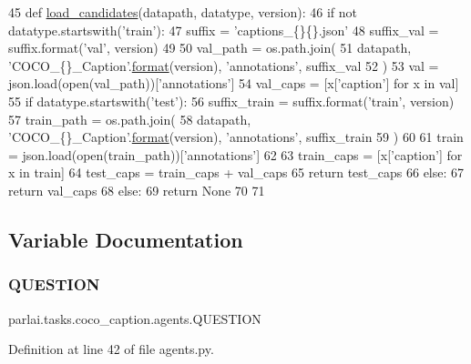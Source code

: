 \begin{DoxyCode}
45 \textcolor{keyword}{def }\hyperlink{namespaceparlai_1_1tasks_1_1coco__caption_1_1agents_aa190162d0e36e1c93fc224b8a049f0cf}{load\_candidates}(datapath, datatype, version):
46     \textcolor{keywordflow}{if} \textcolor{keywordflow}{not} datatype.startswith(\textcolor{stringliteral}{'train'}):
47         suffix = \textcolor{stringliteral}{'captions\_\{\}\{\}.json'}
48         suffix\_val = suffix.format(\textcolor{stringliteral}{'val'}, version)
49 
50         val\_path = os.path.join(
51             datapath, \textcolor{stringliteral}{'COCO\_\{\}\_Caption'}.\hyperlink{namespaceparlai_1_1chat__service_1_1services_1_1messenger_1_1shared__utils_a32e2e2022b824fbaf80c747160b52a76}{format}(version), \textcolor{stringliteral}{'annotations'}, suffix\_val
52         )
53         val = json.load(open(val\_path))[\textcolor{stringliteral}{'annotations'}]
54         val\_caps = [x[\textcolor{stringliteral}{'caption'}] \textcolor{keywordflow}{for} x \textcolor{keywordflow}{in} val]
55         \textcolor{keywordflow}{if} datatype.startswith(\textcolor{stringliteral}{'test'}):
56             suffix\_train = suffix.format(\textcolor{stringliteral}{'train'}, version)
57             train\_path = os.path.join(
58                 datapath, \textcolor{stringliteral}{'COCO\_\{\}\_Caption'}.\hyperlink{namespaceparlai_1_1chat__service_1_1services_1_1messenger_1_1shared__utils_a32e2e2022b824fbaf80c747160b52a76}{format}(version), \textcolor{stringliteral}{'annotations'}, suffix\_train
59             )
60 
61             train = json.load(open(train\_path))[\textcolor{stringliteral}{'annotations'}]
62 
63             train\_caps = [x[\textcolor{stringliteral}{'caption'}] \textcolor{keywordflow}{for} x \textcolor{keywordflow}{in} train]
64             test\_caps = train\_caps + val\_caps
65             \textcolor{keywordflow}{return} test\_caps
66         \textcolor{keywordflow}{else}:
67             \textcolor{keywordflow}{return} val\_caps
68     \textcolor{keywordflow}{else}:
69         \textcolor{keywordflow}{return} \textcolor{keywordtype}{None}
70 
71 
\end{DoxyCode}


\subsection{Variable Documentation}
\mbox{\label{namespaceparlai_1_1tasks_1_1coco__caption_1_1agents_ae61e6e5aaf53f888cd2f82bfc492949a}} 
\subsubsection{\texorpdfstring{Q\+U\+E\+S\+T\+I\+ON}{QUESTION}}
{\footnotesize\ttfamily parlai.\+tasks.\+coco\+\_\+caption.\+agents.\+Q\+U\+E\+S\+T\+I\+ON}



Definition at line 42 of file agents.\+py.


